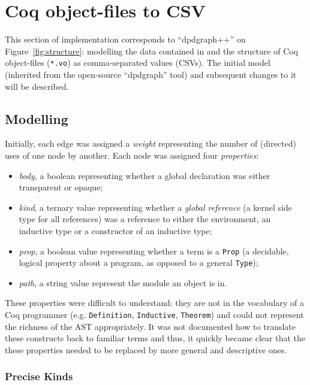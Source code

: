 \section{Coq object-files to CSV}

This section of implementation corresponds to ``dpdgraph++'' on
Figure~\ref{fig:structure}: modelling the data contained in and the structure
of Coq object-files (\texttt{*.vo}) as comma-separated values (CSVs). The
initial model (inherited from the open-source ``dpdgraph'' tool) and subsequent
changes to it will be described.

\subsection{Modelling}

Initially, each edge was assigned a \emph{weight} representing the number of
(directed) uses of one node by another. Each node was assigned four
\emph{properties}: 

\begin{itemize}
  \item \emph{body}, a boolean representing whether a global declaration was
    either transparent or opaque;
  
  \item \emph{kind}, a ternary value representing whether a \emph{global
    reference} (a kernel side type for all references) was a reference to either
    the environment, an inductive type or a constructor of an inductive type;

  \item \emph{prop}, a boolean value representing whether a term is a \texttt{Prop}
    (a decidable, logical property about a program, as opposed to a
    general \texttt{Type});

  \item \emph{path}, a string value represent the module an object is in.
\end{itemize}

These properties were difficult to understand: they are not in the
vocabulary of a Coq programmer (e.g. \texttt{Definition}, \texttt{Inductive},
\texttt{Theorem}) and could not represent the richness of the
AST appropriately. It was not documented how to translate these constructs back
to familiar terms and thus, it quickly became clear that the these properties
needed to be replaced by more general and descriptive ones.

\subsubsection{Precise Kinds}

